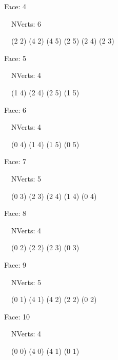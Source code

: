 \documentclass{article}
\begin{document}
    {\footnotesize

    Face: 4

    \   \    NVerts: 6

     \   \   (2 2) (4 2) (4 5) (2 5) (2 4) (2 3)}

    {\footnotesize

    Face: 5

    \   \    NVerts: 4

     \   \   (1 4) (2 4) (2 5) (1 5)}

    {\footnotesize

    Face: 6

    \   \    NVerts: 4

     \   \   (0 4) (1 4) (1 5) (0 5)}

    {\footnotesize

    Face: 7

    \   \    NVerts: 5

     \   \   (0 3) (2 3) (2 4) (1 4) (0 4)}

    {\footnotesize

    Face: 8

    \   \    NVerts: 4

     \   \   (0 2) (2 2) (2 3) (0 3)}

    {\footnotesize

    Face: 9

    \   \    NVerts: 5

     \   \   (0 1) (4 1) (4 2) (2 2) (0 2)}

    {\footnotesize

    Face: 10

    \   \    NVerts: 4

     \   \   (0 0) (4 0) (4 1) (0 1)}


     \newpage
\end{document}
